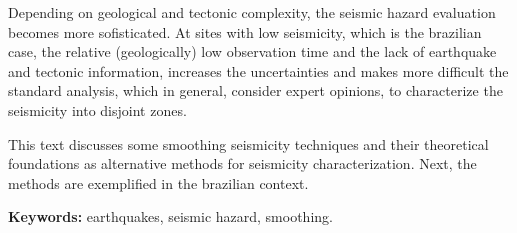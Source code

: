 \documentclass[12pt,twoside,a4paper]{book}
\numberwithin{equation}{section}
\begin{document}
Depending on geological and tectonic complexity, the seismic hazard evaluation becomes more sofisticated.
At sites with low seismicity, which is the brazilian case, the relative (geologically) low observation time
and the lack of earthquake and tectonic information, increases the uncertainties and makes more difficult
the standard analysis, which in general, consider expert opinions, to characterize the
seismicity into disjoint zones. 

This text discusses some smoothing seismicity techniques and their theoretical foundations as alternative
methods for seismicity characterization. Next, the methods are exemplified in the brazilian context.

\noindent \textbf{Keywords:} earthquakes, seismic hazard, smoothing.

\tableofcontents    %

\printglossary[type=\acronymtype,title=Lista de Abreviaturas]

\printglossary[type=symbols,title=Lista de S\'imbolos]




\end{document}
